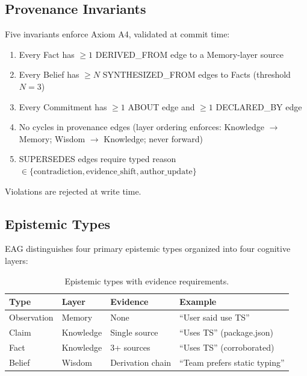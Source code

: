 \documentclass[11pt,letterpaper]{article}
\begin{document}
\subsection{Provenance Invariants}

Five invariants enforce Axiom A4, validated at commit time:

\begin{enumerate}[noitemsep]
    \item[\textbf{I1}] Every Fact has $\geq 1$ DERIVED\_FROM edge to a Memory-layer source
    \item[\textbf{I2}] Every Belief has $\geq N$ SYNTHESIZED\_FROM edges to Facts (threshold $N = 3$)
    \item[\textbf{I3}] Every Commitment has $\geq 1$ ABOUT edge and $\geq 1$ DECLARED\_BY edge
    \item[\textbf{I4}] No cycles in provenance edges (layer ordering enforces: Knowledge $\to$ Memory; Wisdom $\to$ Knowledge; never forward)
    \item[\textbf{I5}] SUPERSEDES edges require typed reason $\in \{\text{contradiction}, \text{evidence\_shift}, \text{author\_update}\}$
\end{enumerate}

Violations are rejected at write time.

\subsection{Epistemic Types}

EAG distinguishes four primary epistemic types organized into four cognitive layers:

\begin{table}[H]
\centering
\caption{Epistemic types with evidence requirements.}
\label{tab:types}
\begin{tabular}{@{}llll@{}}
\toprule
\textbf{Type} & \textbf{Layer} & \textbf{Evidence} & \textbf{Example} \\
\midrule
Observation & Memory & None & ``User said use TS'' \\
Claim & Knowledge & Single source & ``Uses TS'' (package.json) \\
Fact & Knowledge & 3+ sources & ``Uses TS'' (corroborated) \\
Belief & Wisdom & Derivation chain & ``Team prefers static typing'' \\
\bottomrule
\end{tabular}
\end{table}
\end{document}
